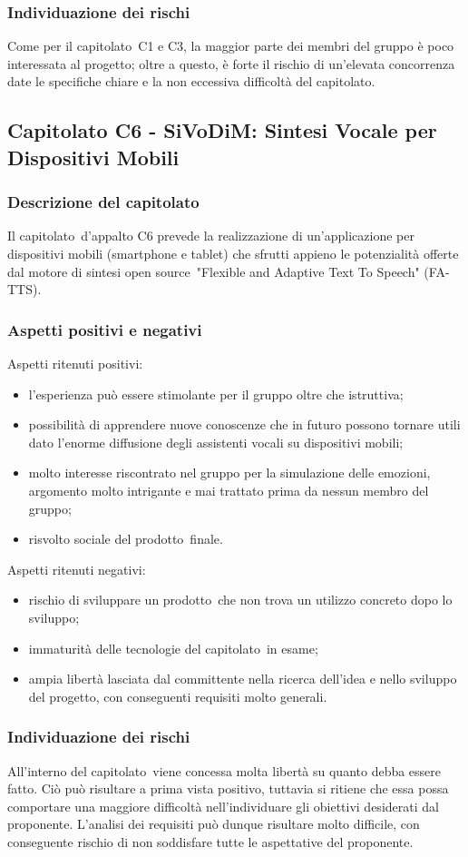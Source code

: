 \documentclass[../StudioDiFattibilita.tex]{subfiles}
\begin{document}
		\subsubsection{Individuazione dei rischi}
		Come per il capitolato\g\ C1 e C3, la maggior parte dei membri del gruppo è poco interessata al progetto; oltre a questo, è forte il rischio di un'elevata concorrenza date le specifiche chiare e la non eccessiva difficoltà del capitolato\g.
	\subsection{Capitolato C6 - SiVoDiM: Sintesi Vocale per Dispositivi Mobili}
		\subsubsection{Descrizione del capitolato}
		Il capitolato\g\ d'appalto C6 prevede la realizzazione di un'applicazione per dispositivi mobili (smartphone e tablet) che sfrutti appieno le potenzialità offerte dal motore di sintesi open source\g\ "Flexible and Adaptive Text To Speech" (FA-TTS).
		\subsubsection{Aspetti positivi e negativi}
		Aspetti ritenuti positivi:
			\begin{itemize}
				\item l'esperienza può essere stimolante per il gruppo oltre che istruttiva;
				\item possibilità di apprendere nuove conoscenze che in futuro possono tornare utili dato l'enorme diffusione degli assistenti vocali su dispositivi mobili;
				\item molto interesse riscontrato nel gruppo per la simulazione delle emozioni, argomento molto intrigante e mai trattato prima da nessun membro del gruppo;
				\item risvolto sociale del prodotto\g\ finale.
			\end{itemize}
		Aspetti ritenuti negativi:
			\begin{itemize}
				\item rischio di sviluppare un prodotto\g\ che non trova un utilizzo concreto dopo lo sviluppo;
				\item immaturità delle tecnologie del capitolato\g\ in esame;
				\item ampia libertà lasciata dal committente nella ricerca dell'idea e nello sviluppo del progetto, con conseguenti requisiti molto generali.
			\end{itemize}
		\subsubsection{Individuazione dei rischi}
		All'interno del capitolato\g\ viene concessa molta libertà su quanto debba essere fatto. Ciò può risultare a prima vista positivo, tuttavia si ritiene che essa possa comportare una maggiore difficoltà nell'individuare gli obiettivi desiderati dal proponente. L'analisi dei requisiti può dunque risultare molto difficile, con conseguente rischio di non soddisfare tutte le aspettative del proponente.
\end{document}
